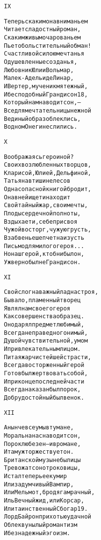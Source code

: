 \begin{minipage}[t]{\dimexpr 0.5\textwidth -\tabcolsep-.5pt}
\begin{alltt}\normalfont\centering
IX

Теперь с каким она вниманьем
Читает сладостный роман,
С каким живым очарованьем
Пьет обольстительный обман!
Счастливой силою мечтанья
Одушевленные созданья,
Любовник Юлии Вольмар,
Малек-Адель и де Линар,
И Вертер, мученик мятежный,
И бесподобный Грандисон 18,
Который нам наводит сон, —
Все для мечтательницы нежной
В единый образ облеклись,
В одном Онегине слились.
\end{alltt}
\end{minipage}

\begin{minipage}[t]{\dimexpr 0.5\textwidth -\tabcolsep-.5pt}
\begin{alltt}\normalfont\centering
X

Воображаясь героиной?
Своих возлюбленных творцов,
Кларисой, Юлией, Дельфиной,
Татьяна в тишине лесов
Одна с опасной книгой бродит,
Она в ней ищет и находит
Свой тайный жар, свои мечты,
Плоды сердечной полноты,
Вздыхает и, себе присвоя
Чужой восторг, чужую грусть,
В забвенье шепчет наизусть
Письмо для милого героя...
Но наш герой, кто б ни был он,
Уж верно был не Грандисон.
\end{alltt}
\end{minipage}
\clearpage

\begin{minipage}[t]{\dimexpr 0.5\textwidth -\tabcolsep-.5pt}
\begin{alltt}\normalfont\centering
XI

Свой слог на важный лад настроя,
Бывало, пламенный творец
Являл нам своего героя
Как совершенства образец.
Он одарял предмет любимый,
Всегда неправедно гонимый,
Душой чувствительной, умом
И привлекательным лицом.
Питая жар чистейшей страсти,
Всегда восторженный герой
Готов был жертвовать собой,
И при конце последней части
Всегда наказан был порок,
Добру достойный был венок.
\end{alltt}
\end{minipage}

\begin{minipage}[t]{\dimexpr 0.5\textwidth -\tabcolsep-.5pt}
\begin{alltt}\normalfont\centering
XII

А нынче все умы в тумане,
Мораль на нас наводит сон,
Порок любезен — и в романе,
И там уж торжествует он.
Британской музы небылицы
Тревожат сон отроковицы,
И стал теперь ее кумир
Или задумчивый Вампир,
Или Мельмот, бродяга мрачный,
Иль Вечный жид, или Корсар,
Или таинственный Сбогар 19.
Лорд Байрон прихотью удачной
Облек в унылый романтизм
И безнадежный эгоизм.
\end{alltt}
\end{minipage}
\clearpage


